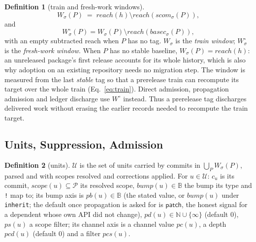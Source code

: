 \documentclass[10pt,conference]{IEEEtran}
\theoremstyle{definition}
\newtheorem{definition}{Definition}
\newcommand{\code}[1]{\texttt{#1}}
\begin{document}
\begin{definition}[train and fresh-work windows]
\label{def:window}
\begin{equation}
  W_\sigma(P) \;=\; \mathit{reach}(h) \setminus
                    \mathit{reach}(\mathit{scom}_\sigma(P)),
  \label{eq:window}
\end{equation}
and
\begin{equation}
  W^\circ_\sigma(P) = W_\sigma(P) \setminus
                       \mathit{reach}(\mathit{basec}_\sigma(P)),
  \label{eq:fresh}
\end{equation}
with an empty subtracted reach when $P$ has no tag.  $W_\sigma$ is the
\emph{train window}; $W^\circ_\sigma$ is the \emph{fresh-work window}.
When $P$ has no stable baseline, $W_\sigma(P) = \mathit{reach}(h)$:
an unreleased package's first release accounts for its whole
history, which is also why adoption on an existing repository needs no
migration step. The window is measured from the last \emph{stable} tag
so that a prerelease train can recompute its target over the whole train
(Eq.~\ref{eq:train}). Direct admission, propagation admission and ledger
discharge use $W^\circ$ instead. Thus a prerelease tag discharges delivered
work without erasing the earlier records needed to recompute the train target.
\end{definition}

\subsection{Units, Suppression, Admission}

\begin{definition}[units]
$\mathcal{U}$ is the set of units carried by commits in
$\bigcup_P W_\sigma(P)$, parsed and with scopes resolved and corrections
applied. For $u \in \mathcal{U}$: $c_u$ is its commit,
$\mathit{scope}(u) \subseteq \mathcal{P}$ its resolved scope,
$\mathit{bump}(u) \in \mathbb{B}$ the bump its type and \code{!} map to;
its bump axis is $\mathit{pb}(u) \in \mathbb{B}$ (the stated value, or
$\mathit{bump}(u)$ under \code{inherit}; the default once propagation is
asked for is $\mathsf{patch}$, the honest signal for a dependent whose
own API did not change), $\mathit{pd}(u) \in \mathbb{N} \cup
\{\infty\}$ (default $0$), $\mathit{ps}(u)$ a scope filter; its channel
axis is a channel value $\mathit{pc}(u)$, a depth $\mathit{pcd}(u)$
(default $0$) and a filter $\mathit{pcs}(u)$.
\end{definition}
\end{document}
